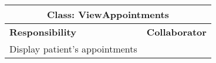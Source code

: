 \documentclass[12pt]{article}
\begin{document}
\begin{center}
\begin{tabularx}{\textwidth}{|X|r|} \hline
\multicolumn{2}{|c|}{\textbf{Class: ViewAppointments}}\\ \hline
\textbf{Responsibility} & \textbf{Collaborator} \\ \hline
Display patient's appointments & \\ \hline
\end{tabularx}
\newline\newline
\end{center}



%
\end{document}
